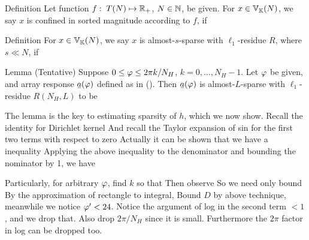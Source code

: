 \Result
{Definition}
{
Let function \(f:\; T (N) \mapsto \mathbb{R}_+\), \(N \in \mathbb{N}\), be given.
For \(x \in \mathbb{V}_{\mathbb{K}}(N)\), we say \(x\) is confined in sorted magnitude according to \(f\), if
}

\Result
{Definition}
{
For \(x \in \mathbb{V}_{\mathbb{K}}(N)\), we say \(x\) is almost-\(s\)-sparse with \(\ell_1\)-residue \(R\), where \(s \ll N\), if
}


\Result
{Lemma (Tentative)}
{
Suppose \(0 \leq \varphi \leq 2\pi k /N_H\), \(k =0, \dotsc, N_H-1\).
Let \(\varphi\) be given, and array response \(\V{a} (\f)\) defined as in ().
Then \(\V{a} (\f)\) is almost-\(L\)-sparse with \(\ell_1\)-residue \(R(N_H, L)\) to be
%
}

The lemma is the key to estimating sparsity of \(h\), which we now show.
Recall the identity for Dirichlet kernel
%
%
And recall the Taylor expansion of sin for the first two terms with respect to zero
%
%
Actually it can be shown that we have a inequality
%
%
Applying the above inequality to the denominator and bounding the nominator by 1, we have
%

Particularly, for arbitrary \(\varphi\), find \(k\) so that
%
Then observe
So we need only bound
By the approximation of rectangle to integral,
Bound \(D\) by above technique, meanwhile we notice \(\varphi' <24\).
Notice the argument of log in the second term \(<1\), and we drop that.
Also drop \(2\pi /N_H\) since it is small.
Furthermore the \(2\pi\) factor in log can be dropped too.


